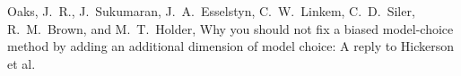 \documentclass[letterpaper,12pt]{article}
\newcommand{\msTitle}{Why you should not fix a biased model-choice method by
adding an additional dimension of model choice: A reply to Hickerson et al.
\xspace}
\begin{document}
\begin{linenumbers}

% 

\newpage
\singlespacing

\renewcommand\listfigurename{Figure Captions}
\renewcommand\cftdotsep{\cftnodots}
\setlength\cftbeforefigskip{10pt}
\listoffigures


\end{linenumbers}

\newpage
\singlespacing



\clearpage

\newpage



\setcounter{figure}{0}
\setcounter{table}{0}
\setcounter{page}{1}

\singlespacing

{
\renewcommand{\refname}{\noindent\MakeUppercase{\LARGE\sffamily\upshape supporting information}}
\begin{thebibliography}{1}
\providecommand{\natexlab}[1]{#1}
\providecommand{\url}[1]{\texttt{#1}}
\providecommand{\urlprefix}{URL }

Oaks, J.~R., J.~Sukumaran, J.~A.\ Esselstyn, C.~W.\ Linkem, C.~D.\ Siler,
    R.~M.\ Brown, and M.~T.\ Holder,
\newblock \msTitle

\end{thebibliography}
}

\doublespacing


\newpage
\singlespacing


\end{document}
